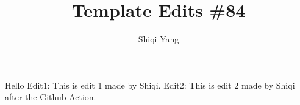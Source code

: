 \documentclass{report}
\title{\Huge{Template Edits \#84}\\}
\author{\huge{Shiqi Yang}}
\date{}
\begin{document}
\maketitle
Hello
Edit1: This is edit 1 made by Shiqi.
Edit2: This is edit 2 made by Shiqi after the Github Action.
\end{document}
